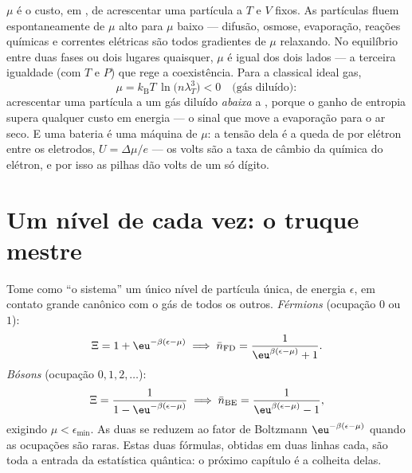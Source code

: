 \begin{definition}\label{def:b3:grand-canonical:mu}
$\mu$ é o custo, em , de acrescentar uma partícula a $T$ e
$V$ fixos. As partículas fluem espontaneamente de $\mu$ alto para $\mu$
baixo --- difusão, osmose, evaporação, reações químicas e correntes
elétricas são todos gradientes de $\mu$ relaxando. No equilíbrio entre
duas fases ou dois lugares quaisquer, $\mu$ é igual dos dois lados ---
a terceira igualdade (com $T$ e $P$) que rege a coexistência. Para
a classical ideal gas,
\[
\mu = k_{\text{B}}T\,\ln\!\big(n\lambda_T^3\big) < 0
\quad\text{(gás diluído)} :
\]
acrescentar uma partícula a um gás diluído \emph{abaixa} a , porque o ganho de entropia supera qualquer custo em energia ---
o sinal que move a evaporação para o ar seco. E uma bateria é uma
máquina de $\mu$: a tensão dela é a queda de  por
elétron entre os eletrodos, $U = \Delta\mu/e$ --- os volts são a taxa
de câmbio da química do elétron, e por isso as pilhas dão volts de um
só dígito.
\end{definition}

\section{Um nível de cada vez: o truque mestre}

\begin{theorem}\label{thm:b3:grand-canonical:occupation}
Tome como ``o sistema'' um único nível de partícula única, de energia
$\epsilon$, em contato grande canônico com o gás de todos os outros.
\emph{Férmions} (ocupação $0$ ou $1$):
\[
\Xi = 1 + \eu^{-\beta(\epsilon - \mu)}
\;\Longrightarrow\;
\bar n_{\text{FD}} = \frac{1}{\eu^{\beta(\epsilon - \mu)} + 1} .
\]
\emph{Bósons} (ocupação $0, 1, 2, \dots$):
\[
\Xi = \frac{1}{1 - \eu^{-\beta(\epsilon - \mu)}}
\;\Longrightarrow\;
\bar n_{\text{BE}} = \frac{1}{\eu^{\beta(\epsilon - \mu)} - 1} ,
\]
exigindo $\mu < \epsilon_{\min}$. As duas se reduzem ao fator de
Boltzmann $\eu^{-\beta(\epsilon - \mu)}$ quando as ocupações são raras.
Estas duas fórmulas, obtidas em duas linhas cada, são toda a entrada da
estatística quântica: o próximo capítulo é a colheita delas.
\end{theorem}

